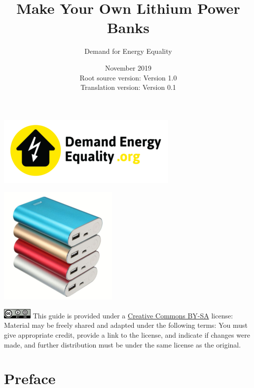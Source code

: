 \documentclass{article}
\title{Make Your Own Lithium Power Banks}
\author{Demand for Energy Equality}
\date{November 2019 \\ Root source version: Version 1.0 \\ Translation version: Version 0.1}
\theoremstyle{definition}
\theoremstyle{definition}
\theoremstyle{remark}
\begin{document}
 
\maketitle{}

\begin{center}
  \includegraphics[]{../Images/image_0_0_(demand_energy_equality).png}
\end{center}
\begin{center}
  \includegraphics[]{../Images/image_0_1_(power_banks).png}
\end{center}

\vfill
  
\includegraphics[]{../Images/image_0_2_(license).png} \newline
This guide is provided under a \href{https://creativecommons.org/licenses/by-sa/4.0/legalcode}{Creative Commons BY-SA} license: \newline
Material may be freely shared and adapted under the following terms: You must give appropriate credit, provide a link to the license, and indicate if changes were made, and further distribution must be under the same license as the original.

\newpage

\tableofcontents

\newpage

\section{Preface} %
\label{sec:preface}
\end{document}
